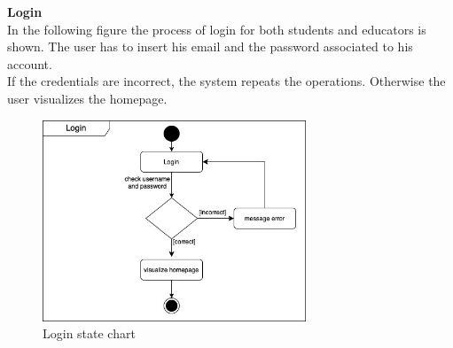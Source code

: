 \textbf{Login}\\
In the following figure the process of login for both students and educators is shown. 
The user has to insert his email and the password associated to his account.
\\If the credentials are incorrect, the system repeats the operations. Otherwise the user visualizes the homepage.
\begin{figure} [H]
  \centering
  \includegraphics[width=0.7\textwidth]{images/state_diagrams/Login.jpg}
  \caption{Login state chart}
\end{figure} \vspace{1cm}

